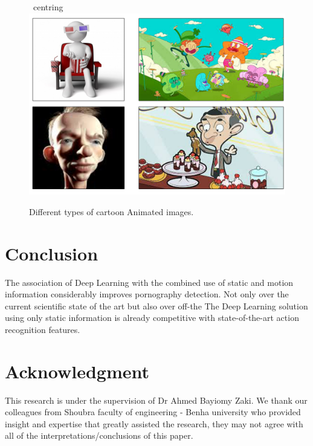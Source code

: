 \documentclass[runningheads]{llncs}
\begin{document}
\begin{figure}
\ centring
\includegraphics[width=.6\textwidth]{figures/cartoons.jpg}
\caption{Different types of cartoon Animated images.} \label{fig1}
\end{figure}

\section{Conclusion}
The association of Deep Learning with the combined use of static and motion information considerably improves pornography detection. Not only over the current scientific state of the art but also over off-the The Deep Learning solution using only static information is already competitive with state-of-the-art action recognition features.\\

\section{Acknowledgment}
This research is under the supervision of Dr Ahmed Bayiomy Zaki. We thank our colleagues from Shoubra faculty of engineering - Benha university who provided insight and expertise that greatly assisted the research, they may not agree with all of the interpretations/conclusions of this paper.\\



\end{document}
